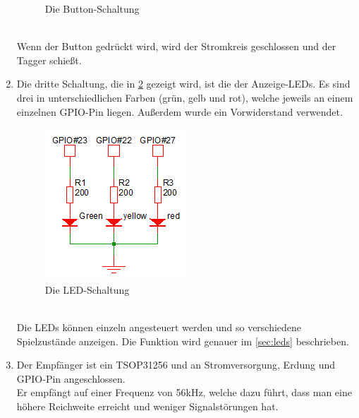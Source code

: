 \begin{enumerate}
\begin{figure}[h]
		\caption{Die Button-Schaltung}
		\label{fig:Bild3Hardware}
	\end{figure}\\
	Wenn der Button gedrückt wird, wird der Stromkreis geschlossen und der Tagger schießt.
	\item Die dritte Schaltung, die in \cref{fig:Bild4Hardware} gezeigt wird, ist die der Anzeige-LEDs. Es sind drei in unterschiedlichen Farben (grün, gelb und rot), welche jeweils an einem einzelnen GPIO-Pin liegen. Außerdem wurde ein Vorwiderstand verwendet.\\
	\begin{figure}[h]
		\centering
		\includegraphics[width=0.3 \textwidth]{./040-komponenten/010-hardware/LEDschaltung.png}
		\caption{Die LED-Schaltung}
		\label{fig:Bild4Hardware}
	\end{figure}\\
	Die LEDs können einzeln angesteuert werden und so verschiedene Spielzustände anzeigen. Die Funktion wird genauer im \cref{sec:leds} beschrieben.
	\item Der Empfänger ist ein TSOP31256 und an Stromversorgung, Erdung und GPIO-Pin angeschlossen.\\
	Er empfängt auf einer Frequenz von 56kHz, welche dazu führt, dass man eine höhere Reichweite erreicht und weniger Signalstörungen hat.

\end{enumerate}
\newpage
